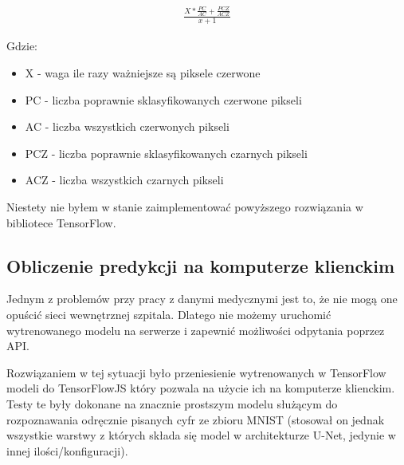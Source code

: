 \documentclass{article}
\begin{document}
\begin{align}
    \frac{X*\frac{PC}{AC} + \frac{PCZ}{ACZ}}{x+1}
\end{align}

Gdzie:
\begin{itemize}
    \item X - waga ile razy ważniejsze są piksele czerwone
    \item PC - liczba poprawnie sklasyfikowanych czerwone pikseli
    \item AC - liczba wszystkich czerwonych pikseli
    \item PCZ - liczba poprawnie sklasyfikowanych czarnych pikseli
    \item ACZ - liczba wszystkich czarnych pikseli
\end{itemize}
Niestety nie byłem w stanie zaimplementować powyższego rozwiązania w bibliotece TensorFlow.

\subsection{Obliczenie predykcji na komputerze klienckim}
Jednym z problemów przy pracy z danymi medycznymi jest to, że nie mogą one opuścić sieci wewnętrznej szpitala.
Dlatego nie możemy uruchomić wytrenowanego modelu na serwerze i zapewnić możliwości odpytania poprzez API.

Rozwiązaniem w tej sytuacji było przeniesienie wytrenowanych w TensorFlow modeli do TensorFlowJS który pozwala na użycie ich na komputerze klienckim.
Testy te były dokonane na znacznie prostszym modelu służącym do rozpoznawania odręcznie pisanych cyfr ze zbioru MNIST (stosował on jednak wszystkie warstwy z których składa się model w architekturze U-Net, jedynie w innej ilości/konfiguracji).
\end{document}
